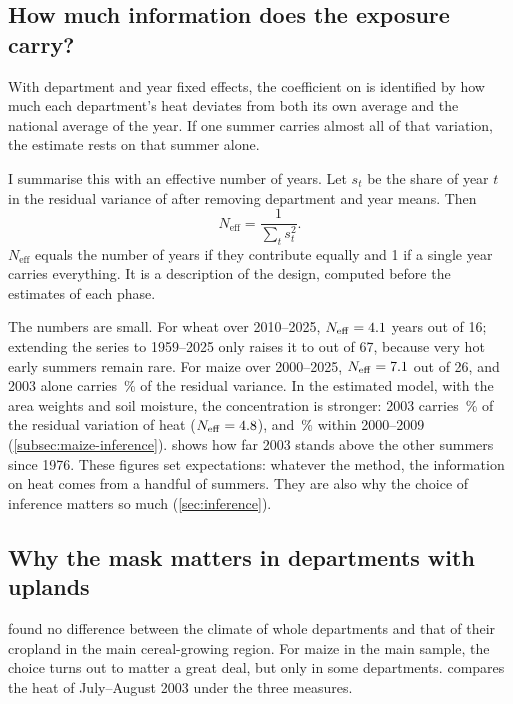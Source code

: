 \subsection{How much information does the exposure carry?}

With department and year fixed effects, the coefficient on \ddthirtytwo{} is identified by how much each department's heat deviates from both its own average and the national average of the year. If one summer carries almost all of that variation, the estimate rests on that summer alone.

I summarise this with an effective number of years. Let $s_t$ be the share of year $t$ in the residual variance of \ddthirtytwo{} after removing department and year means. Then
\begin{equation}
N_{\mathrm{eff}} = \frac{1}{\sum_t s_t^2}.
\end{equation}
$N_{\mathrm{eff}}$ equals the number of years if they contribute equally and 1 if a single year carries everything. It is a description of the design, computed before the estimates of each phase.

The numbers are small. For wheat over 2010--2025, $N_{\mathrm{eff}} = 4.1$ years out of 16; extending the series to 1959--2025 only raises it to \NeffWheatLong{} out of 67, because very hot early summers remain rare. For maize over 2000--2025, $N_{\mathrm{eff}} = 7.1$ out of 26, and 2003 alone carries \NeffMaizeShareTwoThousandThree\,\% of the residual variance. In the estimated model, with the area weights and soil moisture, the concentration is stronger: 2003 carries \LevThree\,\% of the residual variation of heat ($N_{\mathrm{eff}} = 4.8$), and \LevThreeEarly\,\% within 2000--2009 (\cref{subsec:maize-inference}).  shows how far 2003 stands above the other summers since 1976. These figures set expectations: whatever the method, the information on heat comes from a handful of summers. They are also why the choice of inference matters so much (\cref{sec:inference}).

\subsection{Why the mask matters in departments with uplands}

\textcite{benari2018} found no difference between the climate of whole departments and that of their cropland in the main cereal-growing region. For maize in the main sample, the choice turns out to matter a great deal, but only in some departments.  compares the heat of July--August 2003 under the three measures.

